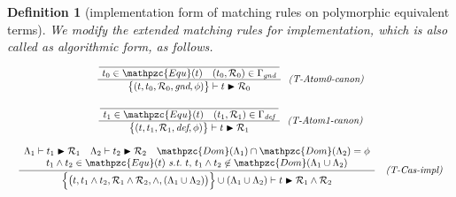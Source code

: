\documentclass[12pt]{article}
\newtheorem{Definition}{Definition}[section]
\begin{document}
\pagebreak
\begin{Definition}[implementation form of matching rules on
    polymorphic equivalent terms]
  We modify the extended matching rules for implementation, which
  is also called as algorithmic form, as follows.
  \begin{displaymath}
    \begin{array}{c}
      
      \begin{array}{rl}
        \dfrac{
          \dfrac{}{
            \raisebox{0.5ex}[2.3ex][0ex]{
              $t_0 \in \mathpzc{Equ}(t)
               \quad (t_0, \mathcal{R}_0) \in \Gamma_\text{\it gnd}$
            }
          }
        }{
          \bigl\{(t, t_0, \mathcal{R}_0, \text{\it gnd}, \phi ) \bigr\}
           \vdash t \blacktriangleright \mathcal{R}_0
        }  &  \!\! \text{\it (T-Atom0-canon)}
      \end{array}  \\
      \\
      
      \begin{array}{rl}
        \dfrac{
          \dfrac{}{
            \raisebox{0.5ex}[2.3ex][0ex]{
              $t_1 \in \mathpzc{Equ}(t)
                \quad (t_1, \mathcal{R}_1) \in \Gamma_\text{\it def}$
            }
          }
        }{
          \bigl\{(t, t_1, \mathcal{R}_1, \text{\it def}, \phi ) \bigr\}
           \vdash t \blacktriangleright \mathcal{R}_1
        }  &  \!\! \text{\it (T-Atom1-canon)}
      \end{array}  \\
      \\
      
      \begin{array}{rl}
        \dfrac{
          \begin{array}{c}
            \Lambda_1 \vdash t_1 \blacktriangleright \mathcal{R}_1
             \quad \Lambda_2 \vdash t_2 \blacktriangleright \mathcal{R}_2
              \quad \mathpzc{Dom}(\Lambda_1) \cap \mathpzc{Dom}(\Lambda_2)
               = \phi  \\
            t_1 \wedge t_2 \in \mathpzc{Equ}(t)\
             \text{\it s.t.}\ t,\, t_1 \wedge t_2 \not\in \mathpzc{Dom}(
              \Lambda_1 \cup \Lambda_2)
          \end{array}
        }{
          \Bigl\{\bigl(t, t_1 \wedge t_2,
           \mathcal{R}_1 \wedge \mathcal{R}_2, \wedge,
            (\Lambda_1 \cup \Lambda_2) \bigr) \Bigr\}
             \cup (\Lambda_1 \cup \Lambda_2) \vdash
              t \blacktriangleright \mathcal{R}_1 \wedge \mathcal{R}_2
        }  &  \text{\it (T-Cas-impl)}
      \end{array}  \\
      \\
      

\end{array}
\end{displaymath}
\end{Definition}
\end{document}

